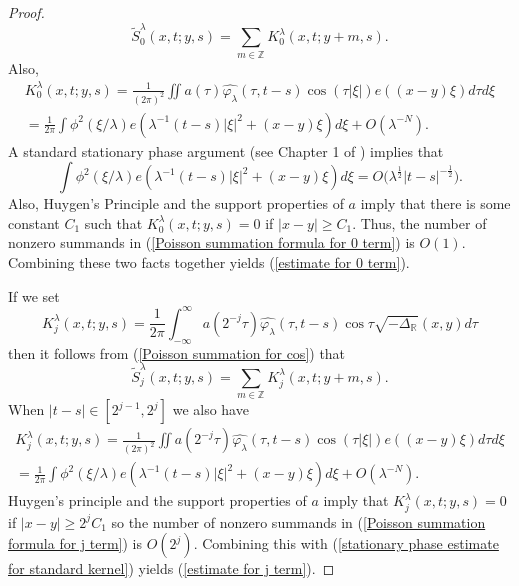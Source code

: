 \documentclass[11pt]{amsart}
\numberwithin{equation}{section}
\newcommand{\la}{\lambda}
\newcommand{\R}[1][]{\mathbb{R}^#1}
\newcommand{\Z}[1][]{\mathbb{Z}^#1}
\newcommand{\laplac}[1]{\Delta_{#1}}
\begin{document}
\begin{proof}
\begin{equation}
    \tilde{S}^{\la}_{0}(x,t;y,s) = \sum_{m \in \Z{}}K^{\la}_{0}(x,t;y+m,s).
\end{equation}
Also, 
\begin{multline}
    K^{\la}_{0}(x,t;y,s) = \frac{1}{(2\pi)^2}\iint a(\tau) \widehat{\varphi_{\la}}(\tau, t-s)\cos(\tau|\xi|)e( (x-y) \xi)d\tau d\xi \\
    = \frac{1}{2\pi}\int \phi^2(\xi/\la)e(\la^{-1}(t-s)|\xi|^2 + (x-y)\xi)d \xi + O(\la^{-N}).
\end{multline}
A standard stationary phase argument (see Chapter 1 of \cite{SoggeFourierIntegrals}) implies that 
\begin{equation} \label{stationary phase estimate for standard kernel}
    \int \phi^2(\xi/\la)e(\la^{-1}(t-s)|\xi|^2 +  (x-y) \xi)d \xi = O\big(\la^{\frac{1}{2}}|t-s|^{-\frac{1}{2}}\big).
\end{equation}
Also, Huygen's Principle and the support properties of $a$ imply that there is some constant $C_1$ such that $K^{\la}_{0}(x,t;y,s) = 0$ if $|x-y| \geq C_1$. Thus, the number of nonzero summands in (\ref{Poisson summation formula for 0 term}) is $O(1)$. Combining these two facts together yields (\ref{estimate for 0 term}).
\par
If we set 
\begin{equation}
    K^{\la}_{j}(x,t;y,s) = \frac{1}{2\pi}\int_{-\infty}^{\infty}a(2^{-j}\tau) \widehat{\varphi_{\la}}(\tau, t-s)\cos\tau\sqrt{-\laplac{\R{}}}(x,y)d\tau
\end{equation}
then it follows from (\ref{Poisson summation for cos}) that 
\begin{equation} \label{Poisson summation formula for j term}
    \tilde{S}^{\la}_{j}(x,t;y,s) = \sum_{m \in \Z{}}K^{\la}_{j}(x,t;y+m,s).
\end{equation}
When $|t-s| \in [2^{j-1}, 2^j]$ we also have
\begin{multline}
    K^{\la}_{j}(x,t;y,s) = \frac{1}{(2\pi)^2}\iint a(2^{-j}\tau) \widehat{\varphi_{\la}}(\tau, t-s)\cos(\tau|\xi|)e(( x-y)\xi)d\tau d\xi \\
    = \frac{1}{2\pi}\int \phi^2(\xi/\la)e(\la^{-1}(t-s)|\xi|^2 + ( x-y)\xi)d \xi + O(\la^{-N}).
\end{multline}
Huygen's principle and the support properties of $a$ imply that $K^{\la}_{j}(x,t;y,s) =0$ if $|x - y| \geq 2^j C_1$ so the number of nonzero summands in (\ref{Poisson summation formula for j term}) is $O(2^{j})$. Combining this with (\ref{stationary phase estimate for standard kernel}) yields (\ref{estimate for j term}).
\end{proof}
\end{document}
